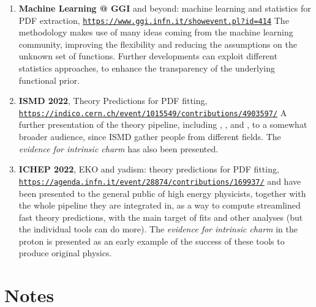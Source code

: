 \documentclass[10pt, a4paper, sans]{moderncv}
\newcommand{\tturl}[1]{\texttt{\url{#1}}}
\begin{document}
\begin{multicols}{2}
\begin{enumerate}
    \item \textbf{Machine Learning @ GGI}
      \nnpdf{} and beyond: machine learning and statistics for PDF extraction,
      \tturl{https://www.ggi.infn.it/showevent.pl?id=414}
      The  methodology makes use of many ideas coming from the
      machine learning community, improving the flexibility and reducing the
      assumptions on the unknown set of functions.
      Further developments can exploit different statistics approaches, to
      enhance the transparency of the underlying functional prior.
    \item \textbf{ISMD 2022},
      Theory Predictions for PDF fitting,
      \tturl{https://indico.cern.ch/event/1015549/contributions/4903597/}
      \newline
      A further presentation of the theory pipeline, including \eko, \yadism,
      and \pineappl, to a somewhat broader audience, since ISMD gather people
      from different fields. The \textit{evidence for intrinsic charm} has also
      been presented.
    \item \textbf{ICHEP 2022}, 
      EKO and yadism: theory predictions for PDF fitting,
      \tturl{https://agenda.infn.it/event/28874/contributions/169937/}
      \newline
      \eko and \yadism have been presented to the general public of high energy
      physicists, together with the whole pipeline they are integrated in, as a
      way to compute streamlined fast theory predictions, with the main target
      of \pdf fits and other analyses (but the individual tools can do more).
      The \textit{evidence for intrinsic charm} in the proton is presented as
      an early example of the success of these tools to produce original
      physics.
\end{enumerate}

\pagebreak

\section{Notes}


\end{multicols}
\end{document}
